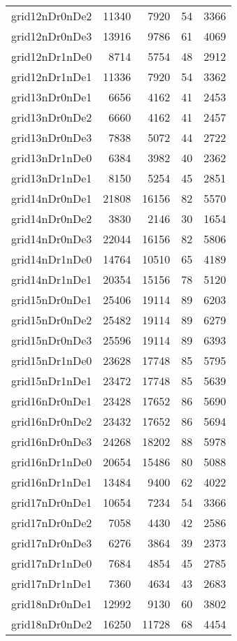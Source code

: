 \begin{longtable}{lrrrr}
grid12nDr0nDe2 & 11340 & 7920 & 54 & 3366 \\
grid12nDr0nDe3 & 13916 & 9786 & 61 & 4069 \\
grid12nDr1nDe0 & 8714 & 5754 & 48 & 2912 \\
grid12nDr1nDe1 & 11336 & 7920 & 54 & 3362 \\
grid13nDr0nDe1 & 6656 & 4162 & 41 & 2453 \\
grid13nDr0nDe2 & 6660 & 4162 & 41 & 2457 \\
grid13nDr0nDe3 & 7838 & 5072 & 44 & 2722 \\
grid13nDr1nDe0 & 6384 & 3982 & 40 & 2362 \\
grid13nDr1nDe1 & 8150 & 5254 & 45 & 2851 \\
grid14nDr0nDe1 & 21808 & 16156 & 82 & 5570 \\
grid14nDr0nDe2 & 3830 & 2146 & 30 & 1654 \\
grid14nDr0nDe3 & 22044 & 16156 & 82 & 5806 \\
grid14nDr1nDe0 & 14764 & 10510 & 65 & 4189 \\
grid14nDr1nDe1 & 20354 & 15156 & 78 & 5120 \\
grid15nDr0nDe1 & 25406 & 19114 & 89 & 6203 \\
grid15nDr0nDe2 & 25482 & 19114 & 89 & 6279 \\
grid15nDr0nDe3 & 25596 & 19114 & 89 & 6393 \\
grid15nDr1nDe0 & 23628 & 17748 & 85 & 5795 \\
grid15nDr1nDe1 & 23472 & 17748 & 85 & 5639 \\
grid16nDr0nDe1 & 23428 & 17652 & 86 & 5690 \\
grid16nDr0nDe2 & 23432 & 17652 & 86 & 5694 \\
grid16nDr0nDe3 & 24268 & 18202 & 88 & 5978 \\
grid16nDr1nDe0 & 20654 & 15486 & 80 & 5088 \\
grid16nDr1nDe1 & 13484 & 9400 & 62 & 4022 \\
grid17nDr0nDe1 & 10654 & 7234 & 54 & 3366 \\
grid17nDr0nDe2 & 7058 & 4430 & 42 & 2586 \\
grid17nDr0nDe3 & 6276 & 3864 & 39 & 2373 \\
grid17nDr1nDe0 & 7684 & 4854 & 45 & 2785 \\
grid17nDr1nDe1 & 7360 & 4634 & 43 & 2683 \\
grid18nDr0nDe1 & 12992 & 9130 & 60 & 3802 \\
grid18nDr0nDe2 & 16250 & 11728 & 68 & 4454 \\

\end{longtable}

